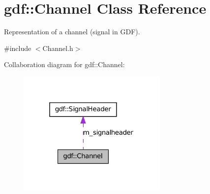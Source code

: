 \hypertarget{classgdf_1_1_channel}{
\section{gdf::Channel Class Reference}
\label{classgdf_1_1_channel}
}


Representation of a channel (signal in GDF).  




{\ttfamily \#include $<$Channel.h$>$}



Collaboration diagram for gdf::Channel:
\nopagebreak
\begin{figure}[H]
\begin{center}
\leavevmode
\includegraphics[width=208pt]{classgdf_1_1_channel__coll__graph}
\end{center}
\end{figure}
